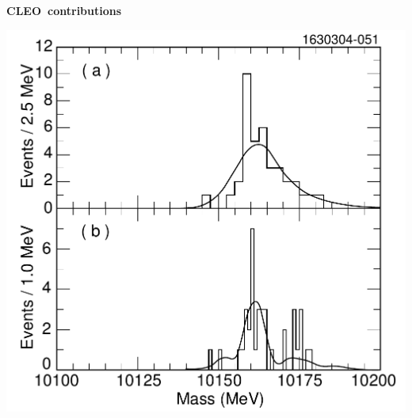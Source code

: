 \documentclass[landscape]{article}
\newenvironment{slide}[1][ ]{\mbox{\bf \boldmath #1 } \vfill}{\vfill \vspace{-1.5 cm} \mbox{ } \pagebreak}
\begin{document}
\begin{slide}[CLEO contributions]
\begin{minipage}{0.6\linewidth}
\begin{itemize}
  \end{itemize}
\end{minipage} \hfill \begin{minipage}{0.38\linewidth}
  \includegraphics[width=\linewidth]{discovery_1d}
\end{minipage}

\vspace{-0.5 cm}

\end{slide}
\end{document}
